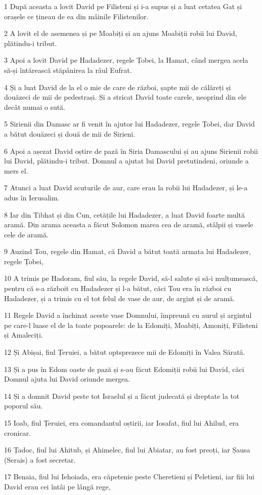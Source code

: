 \par 1 După aceasta a lovit David pe Filisteni și i-a supus și a luat cetatea Gat și orașele ce țineau de ea din mâinile Filistenilor.
\par 2 A lovit el de asemenea și pe Moabiți și au ajuns Moabiții robii lui David, plătindu-i tribut.
\par 3 Apoi a lovit David pe Hadadezer, regele Țobei, la Hamat, când mergea acela să-și întărească stăpânirea la râul Eufrat.
\par 4 Și a luat David de la el o mie de care de război, șapte mii de călăreți și douăzeci de mii de pedestrași. Și a stricat David toate carele, neoprind din ele decât numai o sută.
\par 5 Sirienii din Damasc ar fi venit în ajutor lui Hadadezer, regele Țobei, dar David a bătut douăzeci și două de mii de Sirieni.
\par 6 Apoi a așezat David oștire de pază în Siria Damascului și au ajuns Sirienii robii lui David, plătindu-i tribut. Domnul a ajutat lui David pretutindeni, oriunde a mers el.
\par 7 Atunci a luat David scuturile de aur, care erau la robii lui Hadadezer, și le-a adus în Ierusalim.
\par 8 Iar din Tibhat și din Cun, cetățile lui Hadadezer, a luat David foarte multă aramă. Din arama aceasta a făcut Solomon marea cea de aramă, stâlpii și vasele cele de aramă.
\par 9 Auzind Tou, regele din Hamat, că David a bătut toată armata lui Hadadezer, regele Țobei,
\par 10 A trimis pe Hadoram, fiul său, la regele David, să-l salute și să-i mulțumească, pentru că s-a războit cu Hadadezer și l-a bătut, căci Tou era în război cu Hadadezer, și a trimis cu el tot felul de vase de aur, de argint și de aramă.
\par 11 Regele David a închinat aceste vase Domnului, împreună cu aurul și argintul pe care-l luase el de la toate popoarele: de la Edomiți, Moabiți, Amoniți, Filisteni și Amaleciți.
\par 12 Și Abișai, fiul Țeruiei, a bătut optsprezece mii de Edomiți în Valea Sărată.
\par 13 Și a pus în Edom oaste de pază și s-au făcut Edomiții robii lui David, căci Domnul ajuta lui David oriunde mergea.
\par 14 Și a domnit David peste tot Israelul și a făcut judecată și dreptate la tot poporul său.
\par 15 Ioab, fiul Țeruiei, era comandantul oștirii, iar Iosafat, fiul lui Ahilud, era cronicar.
\par 16 Țadoc, fiul lui Ahitub, și Ahimelec, fiul lui Abiatar, au fost preoți, iar Șausa (Serais) a fost secretar.
\par 17 Benaia, fiul lui Iehoiada, era căpetenie peste Cheretieni și Peletieni, iar fiii lui David erau cei întâi pe lângă rege,

